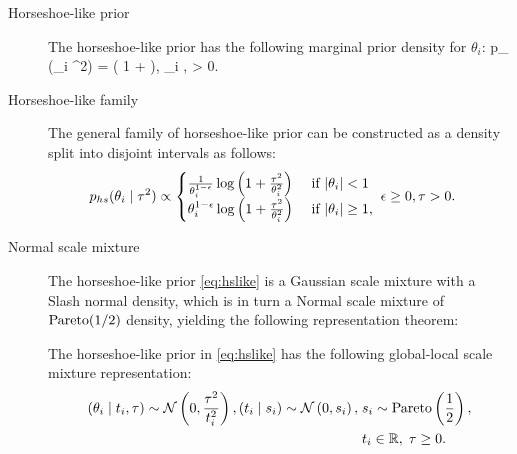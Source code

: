 \documentclass[11pt]{article}
\begin{document}
\begin{description}
\item [Horseshoe-like prior] The horseshoe-like prior
  \citet{bhadra2017horseshoe} has the following marginal prior density for
    $\theta_i$: 
\beq
\tilde p_{} (\theta_i \mid \tau^2) = \log \left ( 1 +  \right ), \quad  \; \theta_i  \in {},\; \tau > 0. \label{eq:hslike}
\eeq
\item [Horseshoe-like family] The general family of horseshoe-like prior can be constructed as a density split into disjoint intervals as follows:
\begin{align}
p_{hs}(\theta_i \mid \tau^2)&  \propto \begin{cases} 
      \frac{1}{\theta_i^{1-\epsilon}}\log \left( 1 + \frac{\tau^2}{\theta_i^2} \right) & \text{ if } {\lvert\theta_i\rvert < 1} \\
      \theta_i^{1-\epsilon} \log \left( 1 + \frac{\tau^2}{\theta_i^2} \right) & \text{ if }{\lvert\theta_i\rvert \ge 1}, \\
      \end{cases} 
\; \epsilon \ge 0,\tau > 0. \label{eq:split} 
\end{align}
\item [Normal scale mixture] The horseshoe-like prior \eqref{eq:hslike} is a Gaussian scale mixture with a Slash normal density, which is in turn a Normal scale mixture of ${\rm Pareto}(1/2)$ density, yielding the following representation theorem: 
\begin{theorem}\label{th:hslike}
The horseshoe-like prior in \eqref{eq:hslike} has the following global-local scale mixture representation:
\begin{align}
(\theta_i \mid t_i, \tau) \sim {\cal N}\left(0, \frac{\tau^2}{t_i^2} \right), (t_i \mid s_i)  \sim {\cal N}\left(0, s_i \right), \; & s_i \sim \mathrm{Pareto}\left( \frac{1}{2} \right), \label{eq:pareto}\\ 
& t_i \in \mathbb{R}, \; \tau \ge 0. \nonumber
\end{align}
\end{theorem}
\end{description}
\end{document}
